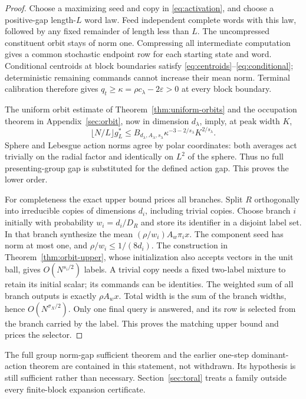 \begin{proof}
Choose a maximizing seed and copy in \eqref{eq:activation}, and choose a positive-gap length-$L$ word law. Feed independent complete words with this law, followed by any fixed remainder of length less than $L$. The uncompressed constituent orbit stays of norm one. Compressing all intermediate computation gives a common stochastic endpoint row for each starting state and word. Conditional centroids at block boundaries satisfy \eqref{eq:centroids}--\eqref{eq:conditional}; deterministic remaining commands cannot increase their mean norm. Terminal calibration therefore gives $q_t\ge\kappa=\rho c_\lambda-2\varepsilon>0$ at every block boundary.

The uniform orbit estimate of Theorem~\ref{thm:uniform-orbits} and the occupation theorem in Appendix~\ref{sec:orbit}, now in dimension $d_\lambda$, imply, at peak width $K$,
\begin{equation}\label{eq:blocked-budget}
 \lfloor N/L\rfloor g_L^*
 \le B_{d_\lambda,A_\lambda,s_\lambda}
       \kappa^{-3-2/s_\lambda}K^{2/s_\lambda}.
\end{equation}
Sphere and Lebesgue action norms agree by polar coordinates: both averages act trivially on the radial factor and identically on $L^2$ of the sphere. Thus no full presenting-group gap is substituted for the defined action gap. This proves the lower order.

For completeness the exact upper bound prices all branches. Split $R$ orthogonally into irreducible copies of dimensions $d_i$, including trivial copies. Choose branch $i$ initially with probability $w_i=d_i/D_R$ and store its identifier in a disjoint label set. In that branch synthesize the mean $(\rho/w_i)A_w\pi_ix$. The component seed has norm at most one, and $\rho/w_i\le1/(8d_i)$. The construction in Theorem~\ref{thm:orbit-upper}, whose initialization also accepts vectors in the unit ball, gives $O(N^{s_i/2})$ labels. A trivial copy needs a fixed two-label mixture to retain its initial scalar; its commands can be identities. The weighted sum of all branch outputs is exactly $\rho A_wx$. Total width is the sum of the branch widths, hence $O(N^{\sigma_X/2})$. Only one final query is answered, and its row is selected from the branch carried by the label. This proves the matching upper bound and prices the selector.
\end{proof}

The full group norm-gap sufficient theorem and the earlier one-step dominant-action theorem are contained in this statement, not withdrawn. Its hypothesis is still sufficient rather than necessary. Section~\ref{sec:toral} treats a family outside every finite-block expansion certificate.

